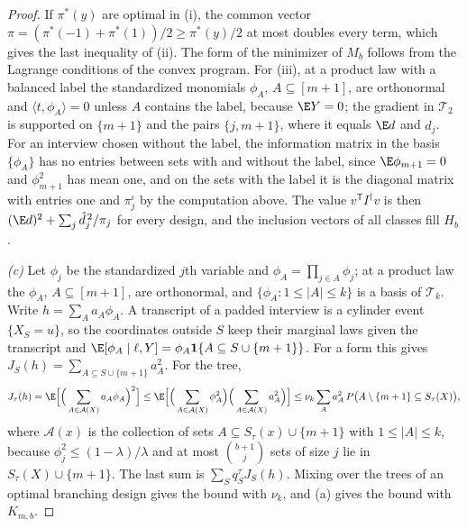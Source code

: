 \begin{proof}
If $\pi^\ast(y)$ are optimal in (i), the common vector
$\pi=(\pi^\ast(-1)+\pi^\ast(1))/2\ge\pi^\ast(y)/2$ at most doubles every
term, which gives the last inequality of (ii). The form of the minimizer of
$M_b$ follows from the Lagrange conditions of the convex program. For (iii),
at a product law with a balanced label the standardized monomials
$\phi_A$, $A\subseteq[m+1]$, are orthonormal and $\langle t,\phi_A\rangle=0$
unless $A$ contains the label, because $\E Y=0$; the gradient in
$\mathcal T_2$ is supported on $\{m+1\}$ and the pairs $\{j,m+1\}$, where it
equals $\E d$ and $\hat d_j$. For an interview chosen without the label, the
information matrix in the basis $\{\phi_A\}$ has no entries between sets with
and without the label, since $\E\phi_{m+1}=0$ and $\phi_{m+1}^2$ has mean one,
and on the sets with the label it is the diagonal matrix with entries one and
$\pi^\iota_j$ by the computation above. The value $v^{\mathsf T}I^\dagger v$
is then $(\E d)^2+\sum_j\hat d_j^{\,2}/\pi_j$ for every design, and the
inclusion vectors of all classes fill $H_b$.

\emph{(c)} Let $\phi_j$ be the standardized $j$th variable and
$\phi_A=\prod_{j\in A}\phi_j$; at a product law the $\phi_A$,
$A\subseteq[m+1]$, are orthonormal, and $\{\phi_A:1\le|A|\le k\}$ is a basis of
$\mathcal T_k$. Write $h=\sum_Aa_A\phi_A$. A transcript of a padded interview
is a cylinder event $\{X_S=u\}$, so the coordinates outside $S$ keep their
marginal laws given the transcript and
$\E[\phi_A\mid\ell,Y]=\phi_A\mathbf 1\{A\subseteq S\cup\{m+1\}\}$. For a form
this gives $J_S(h)=\sum_{A\subseteq S\cup\{m+1\}}a_A^2$. For the tree,
\[
 J_\tau(h)=\E\Big[\Big(\sum_{A\in\mathcal A(X)}a_A\phi_A\Big)^2\Big]
   \le\E\Big[\Big(\sum_{A\in\mathcal A(X)}\phi_A^2\Big)\Big(\sum_{A\in\mathcal A(X)}a_A^2\Big)\Big]
   \le\nu_k\sum_Aa_A^2\,P\big(A\setminus\{m+1\}\subseteq S_\tau(X)\big),
\]
where $\mathcal A(x)$ is the collection of sets $A\subseteq S_\tau(x)\cup\{m+1\}$ with $1\le|A|\le k$,
because $\phi_j^2\le(1-\lambda)/\lambda$ and at most $\binom{b+1}{j}$ sets of
size $j$ lie in $S_\tau(X)\cup\{m+1\}$. The last sum is
$\sum_Sq^\tau_SJ_S(h)$. Mixing over the trees of an optimal branching design
gives the bound with $\nu_k$, and (a) gives the bound with $K_{m,b}$.


\end{proof}
